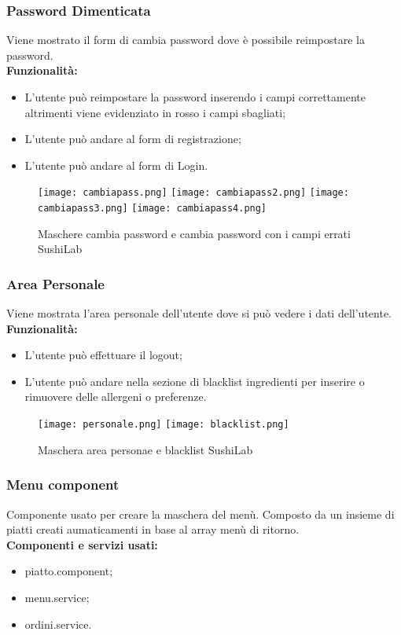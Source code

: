 \subsubsection{Password Dimenticata}
Viene mostrato il form di cambia password dove è possibile reimpostare la password.\\
\textbf{Funzionalità:}
\begin{itemize}
    \setlength\itemsep{.1em}
    \item L'utente può reimpostare la password inserendo i campi correttamente altrimenti viene evidenziato in rosso i campi sbagliati;
    \item L'utente può andare al form di registrazione;
    \item L'utente può andare al form di Login.
\end{itemize}
\begin{figure}[H]
    \centering
    \texttt{[image: cambiapass.png]}
    \texttt{[image: cambiapass2.png]}
    \texttt{[image: cambiapass3.png]}
    \texttt{[image: cambiapass4.png]}
    \caption{Maschere cambia password e cambia password con i campi errati  SushiLab}
\end{figure}
\pagebreak

\subsubsection{Area Personale}
Viene mostrata l'area personale dell'utente dove si può vedere i dati dell'utente.
\textbf{Funzionalità:}
\begin{itemize}
    \item L'utente può effettuare il logout;
    \item L'utente può andare nella sezione di blacklist ingredienti per inserire o rimuovere delle allergeni o preferenze.
\end{itemize}
\begin{figure}[H]
    \centering
    \texttt{[image: personale.png]}
    \texttt{[image: blacklist.png]}
    \caption{Maschera area personae e blacklist SushiLab}
\end{figure}
\label{cap:menu.component}

\subsubsection{Menu component}
Componente usato per creare la maschera del menù. Composto da un insieme di piatti creati aumaticamenti in base al array menù di ritorno.\\
\textbf{Componenti e servizi usati:}
\begin{itemize}
    \item piatto.component;
    \item menu.service;
    \item ordini.service.
\end{itemize}

